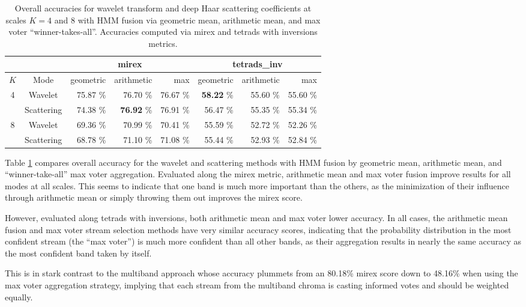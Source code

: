 \begin{table}
	\begin{center}
	\begin{tabular} {| c | c | r  | r | r || r | r | r |}
	\multicolumn{2}{c}{} & \multicolumn{3}{c}{\textsf{mirex}} & \multicolumn{3}{c}{\textsf{tetrads\_inv}} \\
	\hline
	$K$ & Mode & geometric & arithmetic & max & geometric & arithmetic & max  \\
	\hline
	4 & Wavelet & 75.87 \% & 76.70 \% & 76.67 \% & \textbf{58.22} \% & 55.60 \% & 55.60 \% \\
	& Scattering & 74.38 \% & \textbf{76.92} \% & 76.91 \% & 56.47 \% & 55.35 \% & 55.34 \% \\
	\hline
	8 & Wavelet & 69.36 \% & 70.99 \% & 70.41 \% & 55.59 \% & 52.72 \% & 52.26 \% \\
	& Scattering & 68.78 \% & 71.10 \% & 71.08 \% & 55.44 \% & 52.93 \% & 52.84 \% \\
	\hline
	\end{tabular}
	\end{center}
	\protect\caption{Overall accuracies for wavelet transform and deep Haar scattering coefficients at scales $K=4$ and $8$ with HMM fusion via geometric mean, arithmetic mean, and max voter ``winner-takes-all''. Accuracies computed via mirex and tetrads with inversions metrics.
	\label{table:fusion-scores}}
\end{table}

Table \ref{table:fusion-scores} compares overall accuracy for the wavelet and scattering methods with HMM fusion by geometric mean, arithmetic mean, and ``winner-take-all'' max voter aggregation. Evaluated along the mirex metric, arithmetic mean and max voter fusion improve results for all modes at all scales. This seems to indicate that one band is much more important than the others, as the minimization of their influence through arithmetic mean or simply throwing them out improves the mirex score. 

However, evaluated along tetrads with inversions, both arithmetic mean and max voter lower accuracy. In all cases, the arithmetic mean fusion and max voter stream selection methods have very similar accuracy scores, indicating that the probability distribution in the most confident stream (the ``max voter'') is much more confident than all other bands, as their aggregation results in nearly the same accuracy as the most confident band taken by itself. 

This is in stark contrast to the multiband approach whose accuracy plummets from an 80.18\% mirex score down to 48.16\% when using the max voter aggregation strategy, implying that each stream from the multiband chroma is casting informed votes and should be weighted equally.

